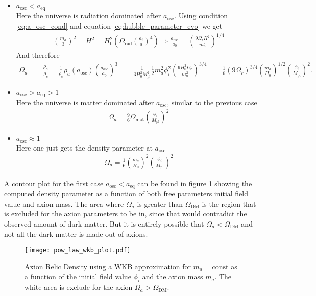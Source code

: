 \documentclass[a4paper, 12pt]{article}
\begin{document}
\begin{itemize}
    \item $a_\mathrm{osc} < a_\mathrm{eq}$ \\
    Here the universe is radiation dominated after $a_\mathrm{osc}$.
    Using condition \ref{eq:a_osc_cond} and equation \ref{eq:hubble_parameter_evo} we get
    \begin{align*}
        \left(\frac{m_a}{3}\right)^2 = H^2 = H_0^2 \left(
        \Omega_\mathrm{rad} \left( \frac{a_i}{a} \right)^4
    \right) \Rightarrow \frac{a_\mathrm{osc}}{a_0} = \left( \frac{9 \Omega_r H_0^2}{m_a^2} \right)^{1/4}
    \end{align*}
    And therefore
    \begin{align*}
        \Omega_a &= \frac{\rho_a}{\rho_c} = \frac{1}{\rho_c} \rho_a(a_\mathrm{osc}) \left( \frac{a_\mathrm{osc}}{a_0} \right)^3
                 &= \frac{1}{3 H_0^2 M_\mathrm{pl}^2} \frac{1}{2} m_a^2 \phi_i^2 \left( \frac{9 H_0^2 \Omega_r}{m_a^2} \right)^{3/4}
                 &= \frac{1}{6} \left( 9 \Omega_r \right)^{3/4} \left( \frac{m_a}{H_0} \right)^{1/2} \left( \frac{\phi_i}{M_\mathrm{pl}} \right)^2.
    \end{align*}
    \item $a_\mathrm{osc} > a_\mathrm{eq} > 1$ \\
    Here the universe is matter dominated after $a_\mathrm{osc}$, similar to the previous case
    \begin{align*}
        \Omega_a = \frac{9}{6} \Omega_\mathrm{mat} \left( \frac{\phi_i}{M_\mathrm{pl}} \right)^2
    \end{align*}
    \item $a_\mathrm{osc} \approx 1$ \\
    Here one just gets the density parameter at $a_\mathrm{osc}$
    \begin{align*}
        \Omega_a = \frac{1}{6} \left( \frac{m_a}{H_0} \right)^2 \left( \frac{\phi_i}{M_\mathrm{pl}} \right)^2
    \end{align*}
\end{itemize}
A contour plot for the first case $a_\mathrm{osc} < a_\mathrm{eq}$ can be found in figure \ref{fig:wkb_ard} showing the computed density parameter as a function of both free parameters
initial field value and axion mass. The area where $\Omega_a$ is greater than $\Omega_\mathrm{DM}$ is the region that is excluded for the axion parameters to be in,
since that would contradict the observed amount of dark matter. But it is entirely possible that $\Omega_a < \Omega_\mathrm{DM}$ and not all the dark matter
is made out of axions.
\begin{figure}
    \centering
    \texttt{[image: pow\_law\_wkb\_plot.pdf]}
    \caption{Axion Relic Density using a WKB approximation for $m_a = \mathrm{const}$
    as a function of the initial field value $\phi_i$ and the axion mass $m_a$. The white area is exclude for the axion $\Omega_a > \Omega_\mathrm{DM}$.
    }
    \label{fig:wkb_ard}
\end{figure}
\end{document}
